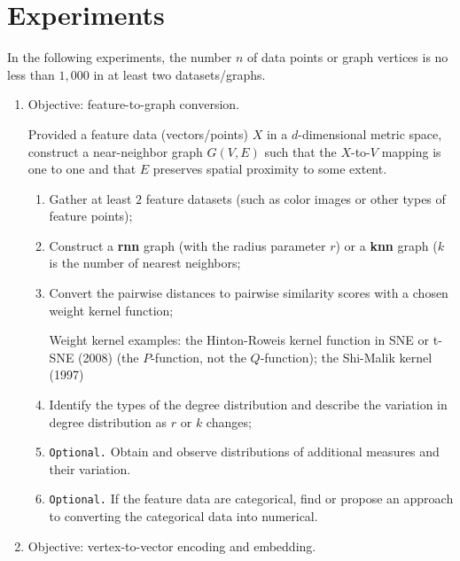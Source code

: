 
\section*{Experiments}

In the following experiments, the number $n$ of data points or graph
vertices is no less than $1,000$ in at least two datasets/graphs.

\begin{enumerate}

\item Objective: feature-to-graph conversion.

  Provided a feature data (vectors/points) $X$ in a $d$-dimensional
  metric space, construct a near-neighbor graph $G(V, E)$ such that
  the $X$-to-$V$ mapping is one to one and that $E$ preserves spatial
  proximity to some extent.

  \begin{enumerate}
  \item Gather at least $2$ feature datasets (such as color images or
    other types of feature points);

  \item Construct a {\bf rnn} graph (with the radius parameter $r$) or
    a {\bf knn} graph ($k$ is the number of nearest neighbors;
    
  \item Convert the pairwise distances to pairwise similarity scores
    with a chosen weight kernel function;

    Weight kernel examples: the Hinton-Roweis kernel function in SNE
    or t-SNE (2008) (the $P$-function, not the $Q$-function); the
    Shi-Malik kernel (1997)
    
  \item Identify the types of the degree distribution and describe the
    variation in degree distribution as $r$ or $k$ changes; 

  \item {\tt Optional.} Obtain and observe distributions of additional
    measures and their variation. 
    
  \item {\tt Optional.}
    If the feature data are categorical, find or
    propose an approach to converting the categorical data into
    numerical.
    
  \end{enumerate} 


\item Objective: vertex-to-vector encoding and embedding.


\end{enumerate}
